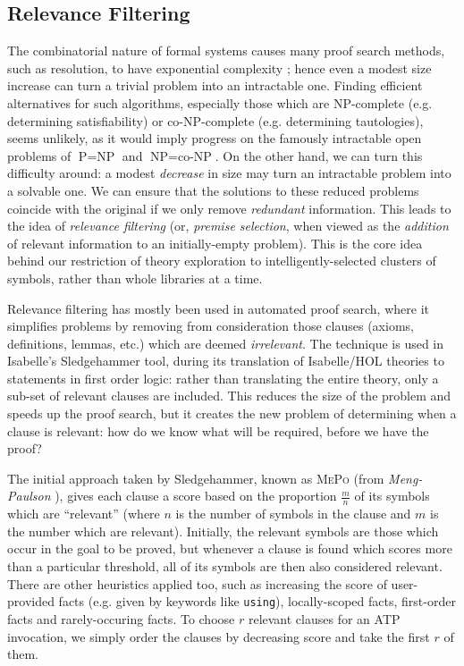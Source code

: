 \subsection{Relevance Filtering}
\label{sec:relevance}

The combinatorial nature of formal systems causes many proof search methods,
such as resolution, to have exponential complexity
\cite{haken1985intractability}; hence even a modest size increase can turn a
trivial problem into an intractable one. Finding efficient alternatives for such
algorithms, especially those which are NP-complete (e.g. determining
satisfiability) or co-NP-complete (e.g. determining tautologies), seems
unlikely, as it would imply progress on the famously intractable open problems
of $\text{P} = \text{NP}$ and $\text{NP} = \text{co-NP}$. On the other hand, we
can turn this difficulty around: a modest \emph{decrease} in size may turn an
intractable problem into a solvable one. We can ensure that the solutions to
these reduced problems coincide with the original if we only remove
\emph{redundant} information. This leads to the idea of \emph{relevance
  filtering} (or, \emph{premise selection}, when viewed as the \emph{addition}
of relevant information to an initially-empty problem). This is the core idea
behind our restriction of theory exploration to intelligently-selected clusters
of symbols, rather than whole libraries at a time.

Relevance filtering has mostly been used in automated proof search, where it
simplifies problems by removing from consideration those clauses (axioms,
definitions, lemmas, etc.) which are deemed \emph{irrelevant}. The technique is
used in Isabelle's Sledgehammer tool, during its translation of Isabelle/HOL
theories to statements in first order logic: rather than translating the entire
theory, only a sub-set of relevant clauses are included. This reduces the size
of the problem and speeds up the proof search, but it creates the new problem of
determining when a clause is relevant: how do we know what will be required,
before we have the proof?

The initial approach taken by Sledgehammer, known as \textsc{MePo} (from
\emph{Meng-Paulson} \cite{meng2009lightweight}), gives each clause a score
based on the proportion $\frac{m}{n}$ of its symbols which are ``relevant''
(where $n$ is the number of symbols in the clause and $m$ is the number which
are relevant). Initially, the relevant symbols are those which occur in the goal
to be proved, but whenever a clause is found which scores more than a particular
threshold, all of its symbols are then also considered relevant. There are other
heuristics applied too, such as increasing the score of user-provided facts
(e.g. given by keywords like \texttt{using}), locally-scoped facts, first-order
facts and rarely-occuring facts. To choose $r$ relevant clauses for an ATP
invocation, we simply order the clauses by decreasing score and take the first
$r$ of them.

